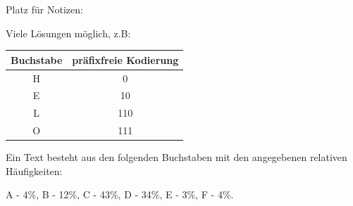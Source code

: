 \begin{questions}
\begin{parts}
            Platz für Notizen:
            \smallskip
            \begin{solutionorgrid}[\stretch{1}]
                Viele Lösungen möglich, z.B:
               
                    \centering
                    \begin{tabular}{|c|c|}
                    \hline
                        Buchstabe & präfixfreie Kodierung  \\ \hline\hline
                       H & 0 \\\hline
                       E & 10 \\  \hline
                       L & 110 \\  \hline
                       O & 111 \\  \hline
                    \end{tabular}
                
            \end{solutionorgrid}
            
        \end{parts}

        \clearpage
        \question
        Ein Text besteht aus den folgenden Buchstaben mit den angegebenen relativen Häufigkeiten:
        
        A - 4\%, B - 12\%, C - 43\%, D - 34\%, E - 3\%, F - 4\%.

        \begin{parts}

\end{parts}
\end{questions}
